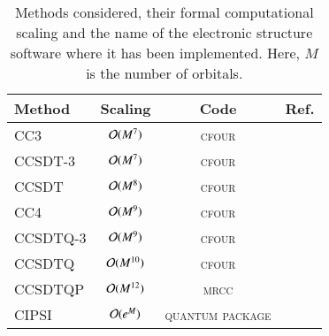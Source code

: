 \documentclass[aip,jcp,reprint,noshowkeys,superscriptaddress]{revtex4-1}
\newcommand{\QP}{\textsc{quantum package}}
\newcommand{\MRCC}{\textsc{mrcc}}
\newcommand{\CFOUR}{\textsc{cfour}}
\begin{document}
\begin{table}
	\caption{Methods considered, their formal computational scaling and the name of the electronic structure software where it has been implemented.
	Here, $M$ is the number of orbitals.
	\label{tab:scaling}}
	\begin{ruledtabular}
	\begin{tabular}{lccc}
		Method	&	Scaling					&	Code		&	Ref.					\\
		\hline
		CC3			&	$\order*{M^{7}}$	&	\CFOUR		&	\onlinecite{cfour}		\\
		CCSDT-3		&	$\order*{M^{7}}$	&	\CFOUR		&	\onlinecite{cfour}		\\
		CCSDT		&	$\order*{M^{8}}$	&	\CFOUR		&	\onlinecite{cfour}		\\
		CC4			&	$\order*{M^{9}}$	&	\CFOUR		&	\onlinecite{cfour}		\\
		CCSDTQ-3	&	$\order*{M^{9}}$	&	\CFOUR		&	\onlinecite{cfour}		\\
		CCSDTQ		&	$\order*{M^{10}}$	&	\CFOUR		&	\onlinecite{cfour}		\\
		CCSDTQP		&	$\order*{M^{12}}$	&	\MRCC		&	\onlinecite{mrcc}		\\	
		CIPSI		&	$\order*{e^{M}}$	&	\QP			&	\onlinecite{qp2}		\\
	\end{tabular}
	\end{ruledtabular}
\end{table}
\end{document}
